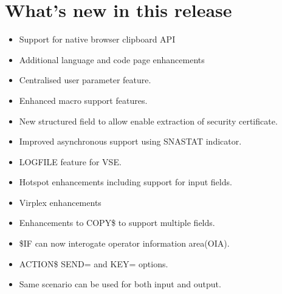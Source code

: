 \documentclass[letterpaper,10pt,english]{sphinxmanual}
\begin{document}
\chapter{What’s new in this release}
\label{\detokenize{Migration_Guide:what-s-new-in-this-release}}\label{\detokenize{Migration_Guide:index-9}}
\begin{itemize}
\item {} 
Support for native browser clipboard API

\item {} 
Additional language and code page enhancements

\item {} 
Centralised user parameter feature.

\item {} 
Enhanced macro support features.

\item {} 
New structured field to allow enable extraction of security certificate.

\item {} 
Improved asynchronous support using SNASTAT indicator.

\item {} 
LOGFILE feature for VSE.

\item {} 
Hotspot enhancements including support for input fields.

\item {} 
Virplex enhancements

\end{itemize}

\begin{itemize}
\item {} 
Enhancements to COPY\$ to support multiple fields.

\item {} 
\$IF can now interogate operator information area(OIA).

\item {} 
ACTION\$ SEND= and KEY= options.

\item {} 
Same scenario can be used for both input and output.

\end{itemize}
\end{document}
